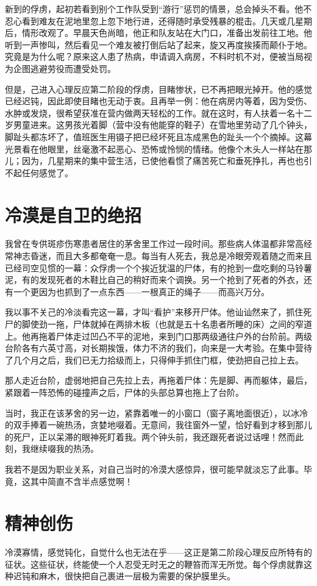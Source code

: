 \documentclass[11pt,oneside]{book}
\begin{document}
\begin{common-format}
新到的俘虏，起初若看到别个工作队受到“游行”惩罚的情景，总会掉头不看。他不忍心看到难友在泥地里忽上忽下地行进，还得随时承受残暴的棍击。几天或几星期后，情形改观了。早晨天色尚暗，他正和队友站在大门口，准备出发前往工地。他听到一声惨叫，然后看见一个难友被打倒后站了起来，旋又再度挨揍而颠仆于地。究竟是为什么呢？原来这人患了热病，申请调入病房，不料时机不对，便被当局视为企图逃避劳役而遭受处罚。

但是，己进入心理反应第二阶段的俘虏，目睹惨状，已不再把眼光掉开。他的感觉已经迟钝，因此即使目睹也无动于衷。且再举一例：他在病房内等着，因为受伤、水肿或发烧，很希望获准在营内做两天轻松的工作。就在这时，有人扶着一名十二岁男童进来。这男孩光着脚（营中没有他能穿的鞋子）在雪地里劳动了几个钟头，脚趾头都冻坏了，值班医生用镊子把已经坏死且冻成黑色的趾头一个个摘掉。这幕光景看在他眼里，丝毫激不起恶心、恐怖或怜悯的情绪。他像个木头人一样站在那儿；因为，几星期来的集中营生活，已使他看惯了痛苦死亡和垂死挣扎，再也也引不起任何感觉了。


\section{冷漠是自卫的绝招}
我曾在专供斑疹伤寒患者居住的茅舍里工作过一段时间。那些病人体温都非常高经常神志昏迷，而且大多都奄奄一息。每当有人死去，我总是冷眼旁观着随之而来且已经司空见惯的一幕：众俘虏一个个挨近犹温的尸体，有的抢到一盘吃剩的马铃薯泥，有的发现死者的木鞋比自己的稍好而来个调换。另一个抢到了死者的外衣，还有一个更因为也抓到了一点东西——一根真正的绳子——而高兴万分。

我以事不关己的冷淡看完这一幕，才叫“看护”来移开尸体。他讪讪然来了，抓住死尸的脚使劲一拖，尸体就掉在两排木板（也就是五十名患者所睡的床）之间的窄道上。他再拖着尸体走过凹凸不平的泥地，来到门口那两级通往户外的台阶前。两级台阶各有六英寸高，对长期挨饿，体力不济的我们，向来是一大考验。在集中营待了几个月之后，我们已无力拾级而上，只得伸手抓住门框，使劲把自己拉上去。

那人走近台阶，虚弱地把自己先拉上去，再拖着尸体：先是脚、再而躯体，最后，紧跟着一阵恐怖的碰撞声之后，尸体的头部总算也拖上了台阶。

当时，我正在该茅舍的另一边，紧靠着唯一的小窗口（窗子离地面很近），以冰冷的双手捧着一碗热汤，贪婪地啜着。无意间，我往窗外一望，恰好看到才移到那儿的死尸，正以呆滞的眼神死盯着我。两个钟头前，我还跟死者说过话哩！然而此刻，我继续啜我的热汤。

我若不是因为职业关系，对自己当时的冷漠大感惊异，很可能早就淡忘了此事。毕竟，这其中简直不含半点感觉啊！


\section{精神创伤}
冷漠寡情，感觉钝化，自觉什么也无法在乎——这正是第二阶段心理反应所特有的征状。这些征状，终能使一个人忍受无时无之的鞭笞而浑无所觉。每个俘虏就靠这种迟钝和麻木，很快把自己裹进一层极为需要的保护膜里头。 
 

\end{common-format}
\end{document}
